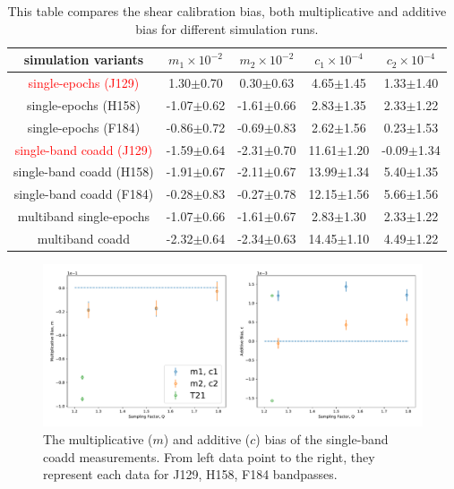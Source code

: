 {\begin{table}
	\centering
	\label{tab:bias_summary}
	\begin{tabular}[scale=1.4]{ c|c|c|c|c } 
		\hline
		simulation variants & $m_{1}\times10^{-2}$ & $m_{2}\times10^{-2}$ & $c_{1}\times10^{-4}$ & $c_{2}\times10^{-4}$\\
		\hline
		\textcolor{red}{single-epochs (J129)} & 1.30$\pm$0.70 & 0.30$\pm$0.63 & 4.65$\pm$1.45 & 1.33$\pm$1.40\\
		single-epochs (H158) & -1.07$\pm$0.62 & -1.61$\pm$0.66 & 2.83$\pm$1.35 & 2.33$\pm$1.22\\
		single-epochs (F184) & -0.86$\pm$0.72 & -0.69$\pm$0.83 & 2.62$\pm$1.56 & 0.23$\pm$1.53\\
		\hline
		\textcolor{red}{single-band coadd (J129)} & -1.59$\pm$0.64 & -2.31$\pm$0.70 & 11.61$\pm$1.20 & -0.09$\pm$1.34\\
		single-band coadd (H158) & -1.91$\pm$0.67 & -2.11$\pm$0.67 & 13.99$\pm$1.34 & 5.40$\pm$1.35\\
		single-band coadd (F184) & -0.28$\pm$0.83 & -0.27$\pm$0.78 & 12.15$\pm$1.56 & 5.66$\pm$1.56\\
		\hline
		multiband single-epochs & -1.07$\pm$0.66 & -1.61$\pm$0.67 & 2.83$\pm$1.30 & 2.33$\pm$1.22 \\
		multiband coadd & -2.32$\pm$0.64 & -2.34$\pm$0.63 & 14.45$\pm$1.10 & 4.49$\pm$1.22\\
		
		\hline
	\end{tabular}
	\caption{This table compares the shear calibration bias, both multiplicative and additive bias for different simulation runs.}
	\label{tab:result}
\end{table}

\begin{figure}
	\includegraphics[scale=0.5]{final_result.pdf}
    \caption{The multiplicative ($m$) and additive ($c$) bias of the single-band coadd measurements. From left data point to the right, they represent each data for J129, H158, F184 bandpasses. }
    \label{fig:final_result}
\end{figure}

}
